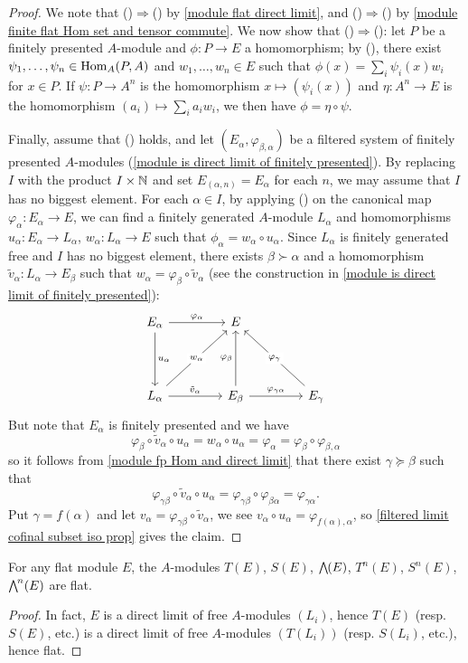 \begin{proof}
We note that ()$\Rightarrow$() by \cref{module flat direct limit}, and ()$\Rightarrow$() by \cref{module finite flat Hom set and tensor commute}. We now show that ()$\Rightarrow$(): let $P$ be a finitely presented $A$-module and $\phi:P\to E$ a homomorphism; by (), there exist $\psi_1,\dots,\psi_n\in\mathrm{Hom}_A(P,A)$ and $w_1,\dots,w_n\in E$ such that $\phi(x)=\sum_i\psi_i(x)w_i$ for $x\in P$. If $\psi:P\to A^n$ is the homomorphism $x\mapsto(\psi_i(x))$ and $\eta:A^n\to E$ is the homomorphism $(a_i)\mapsto\sum_ia_iw_i$, we then have $\phi=\eta\circ\psi$.\par
Finally, assume that () holds, and let $(E_\alpha,\varphi_{\beta,\alpha})$ be a filtered system of finitely presented $A$-modules (\cref{module is direct limit of finitely presented}). By replacing $I$ with the product $I\times\mathbb{N}$ and set $E_{(\alpha,n)}=E_\alpha$ for each $n$, we may assume that $I$ has no biggest element. For each $\alpha\in I$, by applying () on the canonical map $\varphi_\alpha:E_\alpha\to E$, we can find a finitely generated $A$-module $L_\alpha$ and homomorphisms $u_\alpha:E_\alpha\to L_\alpha$, $w_\alpha:L_\alpha\to E$ such that $\phi_\alpha=w_\alpha\circ u_\alpha$. Since $L_\alpha$ is finitely generated free and $I$ has no biggest element, there exists $\beta\succ\alpha$ and a homomorphism $\tilde{v}_\alpha:L_\alpha\to E_\beta$ such that $w_\alpha=\varphi_\beta\circ \tilde{v}_\alpha$ (see the construction in \cref{module is direct limit of finitely presented}):
\[\begin{tikzcd}[row sep=15mm,column sep=15mm]
E_\alpha\ar[r,"\varphi_\alpha"]\ar[d,"u_\alpha"]&E&{}\\
L_\alpha\ar[ru,"w_\alpha"description]\ar[r,"\tilde{v}_\alpha"]&E_\beta\ar[r,"\varphi_{\gamma\alpha}"]\ar[u,"\varphi_\beta"]&E_\gamma\ar[lu,swap,"\varphi_\gamma"description]
\end{tikzcd}\]
But note that $E_\alpha$ is finitely presented and we have
\[\varphi_\beta\circ\tilde{v}_\alpha\circ u_\alpha=w_\alpha\circ u_\alpha=\varphi_\alpha=\varphi_\beta\circ\varphi_{\beta,\alpha}\]
so it follows from \cref{module fp Hom and direct limit} that there exist $\gamma\succeq\beta$ such that
\[\varphi_{\gamma\beta}\circ\tilde{v}_\alpha\circ u_\alpha=\varphi_{\gamma\beta}\circ\varphi_{\beta\alpha}=\varphi_{\gamma\alpha}.\]
Put $\gamma=f(\alpha)$ and let $v_\alpha=\varphi_{\gamma\beta}\circ\tilde{v}_\alpha$, we see $v_\alpha\circ u_\alpha=\varphi_{f(\alpha),\alpha}$, so \cref{filtered limit cofinal subset iso prop} gives the claim.
\end{proof}
\begin{corollary}
For any flat module $E$, the $A$-modules $T(E)$, $S(E)$, $\bigw(E)$, $T^n(E)$, $S^n(E)$, $\bigw^n(E)$ are flat.
\end{corollary}
\begin{proof}
In fact, $E$ is a direct limit of free $A$-modules $(L_i)$, hence $T(E)$ (resp. $S(E)$, etc.) is a direct limit of free $A$-modules $(T(L_i))$ (resp. $S(L_i)$, etc.), hence flat.
\end{proof}
